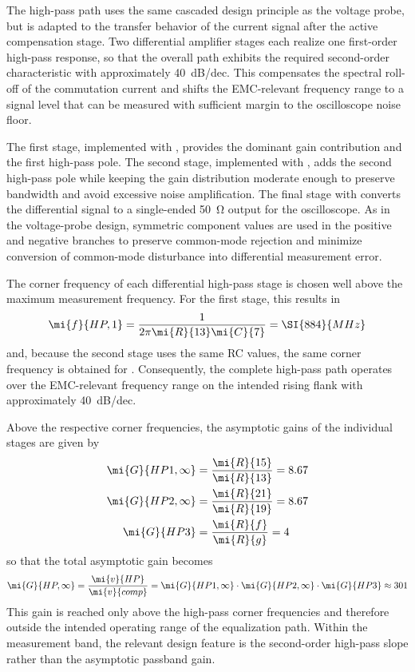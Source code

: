 The high-pass path uses the same cascaded design principle as the voltage probe, but is adapted to the transfer behavior of the current signal after the active compensation stage.
Two differential amplifier stages each realize one first-order high-pass response, so that the overall path exhibits the required second-order characteristic with approximately \SI{+40}{dB/dec}.
This compensates the spectral roll-off of the commutation current and shifts the EMC-relevant frequency range to a signal level that can be measured with sufficient margin to the oscilloscope noise floor.

The first stage, implemented with , provides the dominant gain contribution and the first high-pass pole.
The second stage, implemented with , adds the second high-pass pole while keeping the gain distribution moderate enough to preserve bandwidth and avoid excessive noise amplification.
The final stage with  converts the differential signal to a single-ended \SI{50}{\ohm} output for the oscilloscope.
As in the voltage-probe design, symmetric component values are used in the positive and negative branches to preserve common-mode rejection and minimize conversion of common-mode disturbance into differential measurement error.

The corner frequency of each differential high-pass stage is chosen well above the maximum measurement frequency. For the first stage, this results in
\begin{equation}
	\mi{f}{HP,1} = \frac{1}{2\pi \mi{R}{13}\mi{C}{7}} = \SI{884}{MHz}
\end{equation}
and, because the second stage uses the same RC values, the same corner frequency is obtained for .
Consequently, the complete high-pass path operates over the EMC-relevant frequency range on the intended rising flank with approximately \SI{+40}{dB/dec}.

Above the respective corner frequencies, the asymptotic gains of the individual stages are given by
\begin{align}
	\mi{G}{HP1,\infty} &= \frac{\mi{R}{15}}{\mi{R}{13}} = 8.67 \\
	\mi{G}{HP2,\infty} &= \frac{\mi{R}{21}}{\mi{R}{19}} = 8.67 \\
	\mi{G}{HP3} &= \frac{\mi{R}{f}}{\mi{R}{g}} = 4
\end{align}
so that the total asymptotic gain becomes
\begin{equation}
	\mi{G}{HP,\infty} = \frac{\mi{v}{HP}}{\mi{v}{comp}} = \mi{G}{HP1,\infty}\cdot\mi{G}{HP2,\infty}\cdot\mi{G}{HP3} \approx 301
\end{equation}
This gain is reached only above the high-pass corner frequencies and therefore outside the intended operating range of the equalization path.
Within the measurement band, the relevant design feature is the second-order high-pass slope rather than the asymptotic passband gain.


